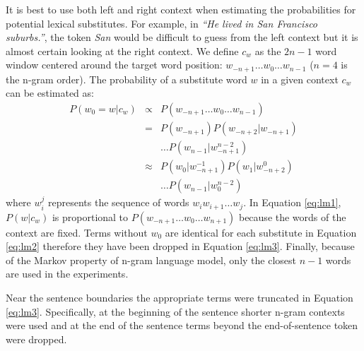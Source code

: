 It is best to use both left and right context when estimating the
probabilities for potential lexical substitutes.  For example, in
\emph{``He lived in San Francisco suburbs.''}, the token \emph{San}
would be difficult to guess from the left context but it is almost
certain looking at the right context.  We define $c_w$ as the $2n-1$
word window centered around the target word position: $w_{-n+1} \ldots
w_0 \ldots w_{n-1}$ ($n=4$ is the n-gram order).  The probability of a
substitute word $w$ in a given context $c_w$ can be estimated as:
\begin{eqnarray}
  \label{eq:lm1}P(w_0 = w | c_w) & \propto & P(w_{-n+1}\ldots w_0\ldots w_{n-1})\\
  \label{eq:lm2}& = & P(w_{-n+1})P(w_{-n+2}|w_{-n+1})\nonumber\\
  &&\ldots P(w_{n-1}|w_{-n+1}^{n-2})\\
  \label{eq:lm3}& \approx & P(w_0| w_{-n+1}^{-1})P(w_{1}|w_{-n+2}^0)\nonumber\\
  &&\ldots P(w_{n-1}|w_0^{n-2})
\end{eqnarray}
where $w_i^j$ represents the sequence of words $w_i w_{i+1} \ldots
w_{j}$.  In Equation \ref{eq:lm1}, $P(w|c_w)$ is proportional to
$P(w_{-n+1}\ldots w_0 \ldots w_{n+1})$ because the words of the
context are fixed.  Terms without $w_0$ are identical for each
substitute in Equation \ref{eq:lm2} therefore they have been dropped
in Equation \ref{eq:lm3}.  Finally, because of the Markov property of
n-gram language model, only the closest $n-1$ words are used in the
experiments.

Near the sentence boundaries the appropriate terms were truncated in
Equation \ref{eq:lm3}.  Specifically, at the beginning of the sentence
shorter n-gram contexts were used and at the end of the sentence terms
beyond the end-of-sentence token were dropped.  


